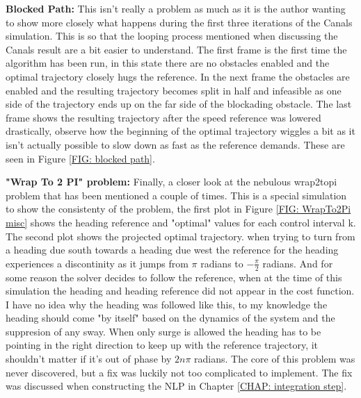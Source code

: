 \textbf{Blocked Path:}\newline
This isn't really a problem as much as it is the author wanting to show more closely what happens during the first three iterations
of the Canals simulation. This is so that the looping process mentioned when discussing the Canals result are a bit easier to understand.
The first frame is the first time the algorithm has been run, in this state there are no obstacles enabled and the optimal trajectory
closely hugs the reference. In the next frame the obstacles are enabled and the resulting trajectory becomes split in half and infeasible
as one side of the trajectory ends up on the far side of the blockading obstacle. The last frame shows the resulting trajectory
after the speed reference was lowered drastically, observe how the beginning of the optimal trajectory wiggles a bit as it isn't 
actually possible to slow down as fast as the reference demands. These are seen in Figure \ref{FIG: blocked path}.

\textbf{"Wrap To 2 PI" problem:}\newline
Finally, a closer look at the nebulous wrap2topi problem that has been mentioned a couple of times. This is a special simulation
to show the consistenty of the problem, the first plot in Figure \ref{FIG: WrapTo2Pi misc} shows the heading reference and
"optimal" values for each control interval k. The second plot shows the projected optimal trajectory.
when trying to turn from a heading due south towards a heading due west the reference for the heading experiences a 
discontinity as it jumps from $\pi$ radians to $-\frac{\pi}{2}$ radians. And for some reason the solver decides to follow the reference, when 
at the time of this simulation the heading and heading reference did not appear in the cost function. I have no idea why
the heading was followed like this, to my knowledge the heading should come "by itself" based on the dynamics of the system and the
suppresion of any sway. When only surge is allowed the heading has to be pointing in the right direction to keep up with
the reference trajectory, it shouldn't matter if it's out of phase by $2n\pi$ radians. The core of this problem was never discovered, but
a fix was luckily not too complicated to implement. The fix was discussed when constructing the \gls{NLP} in Chapter \ref{CHAP: integration step}.


